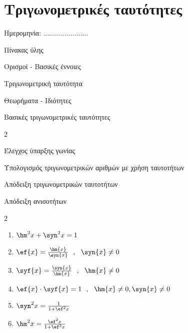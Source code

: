 \documentclass[twoside,nofonts,internet,math,spyros]{frontisthrio}
\newcommand{\myitem}{\stepcounter{enumi}\item[\raisebox{0.5mm}{\faEdit}\ \Large$\square$]}
\begin{document}
\newpage
\section{Τριγωνομετρικές ταυτότητες}
\begin{flushright}
\faCalendar* Ημερομηνία: .......................
\end{flushright}
\begin{mybox}[mysubtitle]{Πίνακας ύλης}
\begin{tcbraster}[raster columns=2,raster equal height]
\begin{myleftbox}{Ορισμοί - Βασικές έννοιες\ \ \faBook}
\begin{arithmisi}[itemsep=0mm]
\item Τριγωνομετρική ταυτότητα
\end{arithmisi}
\end{myleftbox}
\begin{myrightbox}{Θεωρήματα - Ιδιότητες\ \ \faTools}
\begin{arithmisi}[itemsep=0mm]
\item Βασικές τριγωνομετρικές ταυτότητες
\end{arithmisi}
\end{myrightbox}
\end{tcbraster}
\begin{multicols}{2}
\begin{todolist}[itemsep=0mm]
\item Έλεγχος ύπαρξης γωνίας
\myitem Υπολογισμός τριγωνομετρικών αριθμών με χρήση ταυτοτήτων
\myitem Απόδειξη τριγωνομετρικών ταυτοτήτων
\item Απόδειξη ανισοτήτων
\end{todolist}
\end{multicols}
\begin{multicols}{2}
\begin{enumerate}[itemsep=0mm]
\item $ \hm^2{x}+\syn^2{x}=1 $
\item $ \ef{x}=\frac{\hm{x}}{\syn{x}}\ \ ,\ \ \syn{x}\neq 0 $
\item $ \syf{x}=\frac{\syn{x}}{\hm{x}}\ \ ,\ \ \hm{x}\neq 0 $
\item $ \ef{x}\cdot\syf{x}=1\ \ ,\ \ \hm{x}\neq 0,\syn{x}\neq 0 $
\item $ \syn^2{x}=\frac{1}{1+\ef^2{x}} $
\item $ \hm^2{x}=\frac{\ef^2{x}}{1+\ef^2{x}} $
\end{enumerate}
\end{multicols}
\end{mybox}
\end{document}
